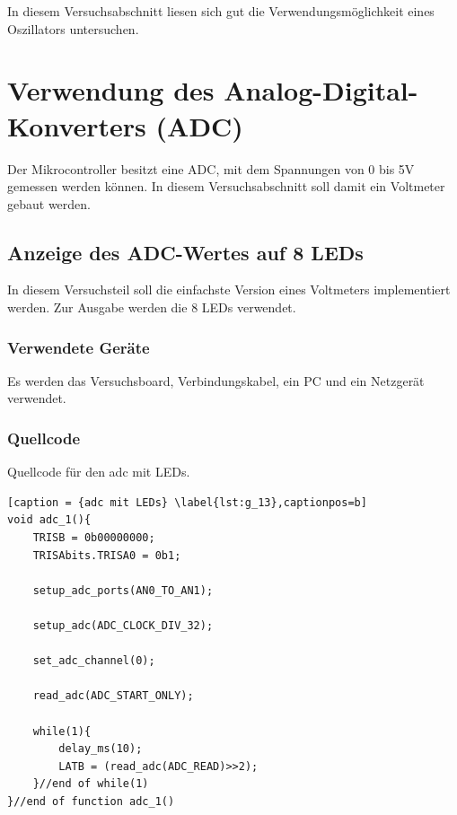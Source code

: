 \documentclass[12pt,a4paper]{article}
\begin{document}
In diesem Versuchsabschnitt liesen sich gut die Verwendungsmöglichkeit eines Oszillators untersuchen.

\section{Verwendung des Analog-Digital-Konverters (ADC)}

Der Mikrocontroller besitzt eine ADC, mit dem Spannungen von 0 bis 5V gemessen werden können. In diesem Versuchsabschnitt soll damit ein Voltmeter gebaut werden.

\subsection{Anzeige des ADC-Wertes auf 8 LEDs}

In diesem Versuchsteil soll die einfachste Version eines Voltmeters implementiert werden. Zur Ausgabe werden die 8 LEDs verwendet.

\subsubsection*{Verwendete Geräte}

Es werden das Versuchsboard, Verbindungskabel, ein PC und ein Netzgerät verwendet.


\subsubsection*{Quellcode}

Quellcode für den adc mit LEDs.

\lstset{language=C, basicstyle=\tiny}
\begin{lstlisting}[caption = {adc mit LEDs} \label{lst:g_13},captionpos=b]
void adc_1(){
	TRISB = 0b00000000;
	TRISAbits.TRISA0 = 0b1;
	
	setup_adc_ports(AN0_TO_AN1);
	
	setup_adc(ADC_CLOCK_DIV_32);
	
	set_adc_channel(0);
	
	read_adc(ADC_START_ONLY);
	
	while(1){
		delay_ms(10);
		LATB = (read_adc(ADC_READ)>>2);
	}//end of while(1)
}//end of function adc_1()
\end{lstlisting}
\end{document}
